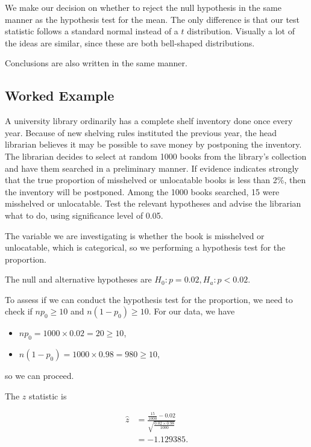 \documentclass[
]{book}
\providecommand{\tightlist}{%
  \setlength{\itemsep}{0pt}\setlength{\parskip}{0pt}}
\begin{document}
We make our decision on whether to reject the null hypothesis in the same manner as the hypothesis test for the mean. The only difference is that our test statistic follows a standard normal instead of a \(t\) distribution. Visually a lot of the ideas are similar, since these are both bell-shaped distributions.

Conclusions are also written in the same manner.

\hypertarget{worked-example-6}{%
\subsection{Worked Example}\label{worked-example-6}}

A university library ordinarily has a complete shelf inventory done once every year. Because of new shelving rules instituted the previous year, the head librarian believes it may be possible to save money by postponing the inventory. The librarian decides to select at random 1000 books from the library's collection and have them searched in a preliminary manner. If evidence indicates strongly that the true proportion of misshelved or unlocatable books is less than 2\%, then the inventory will be postponed. Among the 1000 books searched, 15 were misshelved or unlocatable. Test the relevant hypotheses and advise the librarian what to do, using significance level of 0.05.

The variable we are investigating is whether the book is misshelved or unlocatable, which is categorical, so we performing a hypothesis test for the proportion.

The null and alternative hypotheses are \(H_0: p = 0.02, H_a: p < 0.02\).

To assess if we can conduct the hypothesis test for the proportion, we need to check if \(n p_0 \geq 10\) and \(n(1-p_0) \geq 10\). For our data, we have

\begin{itemize}
\tightlist
\item
  \(n p_0 = 1000 \times 0.02 = 20 \geq 10\),
\item
  \(n (1-p_0) = 1000 \times 0.98 = 980 \geq 10\),
\end{itemize}

so we can proceed.

The \(z\) statistic is

\[
\begin{split}
\hat{z} &= \frac{\frac{15}{1000} - 0.02}{\sqrt{\frac{0.02 \times 0.98}{1000}}} \\
        &= -1.129385.
\end{split}
\]
\end{document}
